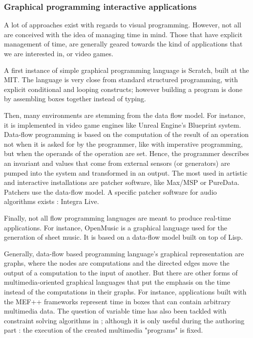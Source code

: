 \documentclass{sigchi}
\begin{document}
\subsubsection{Graphical programming interactive applications}
A lot of approaches exist with regards to visual programming. However, not all are conceived with the idea of managing time in mind. Those that have explicit management of time, are generally geared towards the kind of applications that we are interested in, or video games.

A first instance of simple graphical programming language is Scratch\cite{resnick2009scratch}, built at the MIT. The language is very close from standard structured programming, with explicit conditional and looping constructs; however building a program is done by assembling boxes together instead of typing.

Then, many environments are stemming from the data flow model. For instance, it is implemented in video game engines like Unreal Engine's Blueprint system\cite{shah2014mastering}. Data-flow programming is based on the computation of the result of an operation not when it is asked for by the programmer, like with imperative programming, but when the operands of the operation are set. Hence, the programmer describes an invariant and values that come from external sensors (or generators) are pumped into the system and transformed in an output.
The most used in artistic and interactive installations are patcher software, like Max/MSP or PureData. Patchers use the data-flow model. A specific patcher software for audio algorithms exists : Integra Live\cite{bullock2011integra}.

Finally, not all flow programming languages are meant to produce real-time applications. For instance, OpenMusic\cite{bresson_openmusic:_2011} is a graphical language used for the generation of sheet music. It is based on a data-flow model built on top of Lisp.

Generally, data-flow based programming language's graphical representation are graphs, where the nodes are computations and the directed edges move the output of a computation to the input of another.
But there are other forms of multimedia-oriented graphical languages that put the emphasis on the time instead of the computations in their graphs. For instance, applications built with the MEF++ frameworks\cite{ackermann_direct_1994} represent time in boxes that can contain arbitrary multimedia data. The question of variable time has also been tackled with constraint solving algorithms in \cite{song_interactive_1999}; although it is only useful during the authoring part : the execution of the created multimedia "programs" is fixed.
\end{document}
